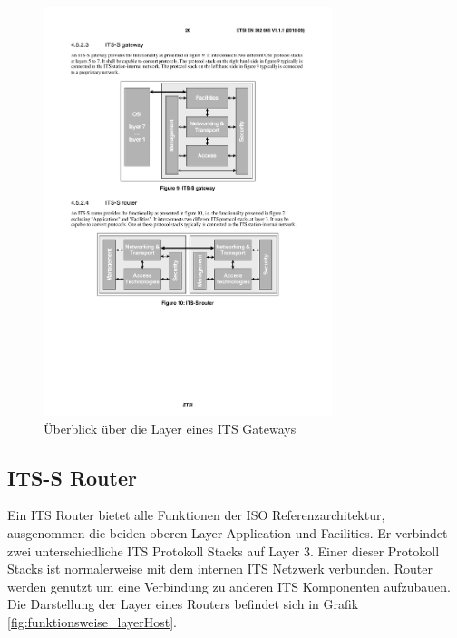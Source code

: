 \begin{figure}[h]
	\includegraphics[width=0.75\textwidth]{content/images/01_funktionsweise/layer_gateway.pdf}
	\caption{Überblick über die Layer eines ITS Gateways \cite{etsi2010302}}
	\label{fig:funktionsweise_itsGateway}
\end{figure}


\subsection{ITS-S Router \label{funktionsweise_router}}
Ein \ac{ITS} Router bietet alle Funktionen der \ac{ISO} Referenzarchitektur, ausgenommen die beiden oberen Layer Application und Facilities. Er verbindet zwei unterschiedliche \ac{ITS} Protokoll Stacks auf Layer 3. Einer dieser Protokoll Stacks ist normalerweise mit dem internen \ac{ITS} Netzwerk verbunden. Router werden genutzt um eine Verbindung zu anderen \ac{ITS} Komponenten aufzubauen. Die Darstellung der Layer eines Routers befindet sich in Grafik  \ref{fig:funktionsweise_layerHost}.

